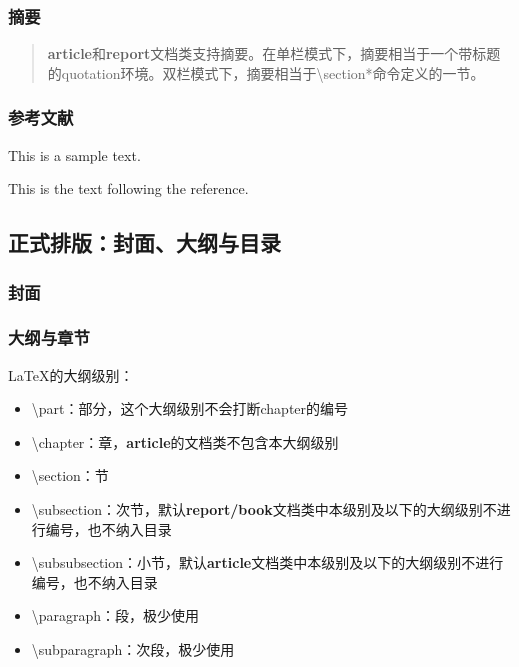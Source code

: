 \documentclass{ctexart}
\begin{document}
        \subsubsection{摘要}
            \renewcommand{\abstractname}{这是摘要} %
            \begin{abstract}
                \textbf{article}和\textbf{report}文档类支持摘要。在单栏模式下，摘要相当于一个带标题的quotation环境。双栏模式下，摘要相当于\textbackslash section*命令定义的一节。
            \end{abstract}
        
        \subsubsection{参考文献}
            This is a sample text.\cite{author1.year1,author2.year2}

            This is the text following the reference. 


    \subsection{正式排版：封面、大纲与目录}
        \subsubsection{封面}
        \subsubsection{大纲与章节}
            \LaTeX 的大纲级别：

            \begin{itemize}
                \item \textbackslash part：部分，这个大纲级别不会打断chapter的编号
                \item \textbackslash chapter：章，\textbf{article}的文档类不包含本大纲级别
                \item \textbackslash section：节
                \item \textbackslash subsection：次节，默认\textbf{report/book}文档类中本级别及以下的大纲级别不进行编号，也不纳入目录
                \item \textbackslash subsubsection：小节，默认\textbf{article}文档类中本级别及以下的大纲级别不进行编号，也不纳入目录
                \item \textbackslash paragraph：段，极少使用
                \item \textbackslash subparagraph：次段，极少使用
            \end{itemize}
\end{document}
